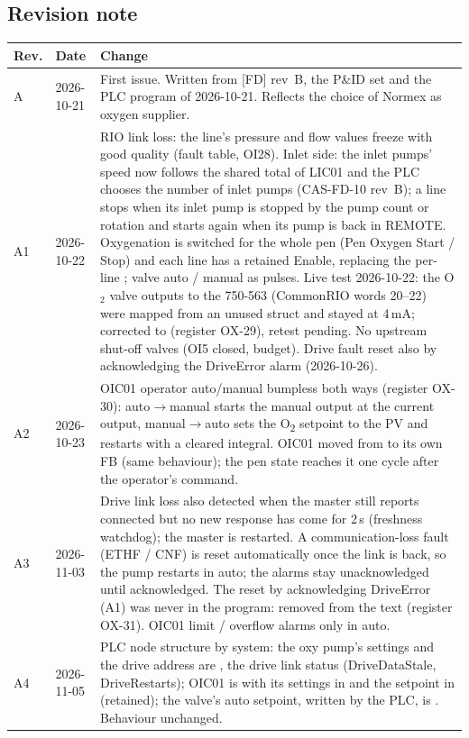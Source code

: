 \documentclass[11pt,a4paper]{article}
\newcommand{\Otwo}{O\textsubscript{2}}
\begin{document}
\subsection{Revision note}
\begin{small}
\begin{tabularx}{\textwidth}{@{}P{10mm}P{22mm}L@{}}
\toprule
Rev. & Date & Change \\
\midrule
A & 2026-10-21 & First issue. Written from [FD] rev~B, the P\&ID set and the PLC program of 2026-10-21. Reflects the choice of Normex as oxygen supplier. \\
A1 & 2026-10-22 & RIO link loss: the line's pressure and flow values freeze with good quality (fault table, OI28). Inlet side: the inlet pumps' speed now follows the shared total of LIC01 and the PLC chooses the number of inlet pumps (CAS-FD-10 rev~B); a line stops when its inlet pump is stopped by the pump count or rotation and starts again when its pump is back in REMOTE. Oxygenation is switched for the whole pen (Pen Oxygen Start / Stop) and each line has a retained Enable, replacing the per-line ; valve auto / manual as pulses. Live test
  2026-10-22: the O$_2$ valve outputs to the 750-563 (CommonRIO words 20--22) were mapped from an unused
  struct and stayed at 4\,mA; corrected to  (register OX-29), retest pending.
  No upstream shut-off valves (OI5 closed, budget). Drive fault reset also by acknowledging the
  DriveError alarm (2026-10-26). \\
A2 & 2026-10-23 & OIC01 operator auto/manual bumpless both ways (register OX-30): auto$\to$manual starts the
  manual output at the current output, manual$\to$auto sets the \Otwo{} setpoint to the PV and restarts
  with a cleared integral. OIC01 moved from  to its own FB 
  (same behaviour); the pen state reaches it one cycle after the operator's command. \\
A3 & 2026-11-03 & Drive link loss also detected when the master still reports connected but no new
  response has come for 2\,s (freshness watchdog); the master is restarted. A communication-loss fault
  (ETHF / CNF) is reset automatically once the link is back, so the pump restarts in auto; the alarms
  stay unacknowledged until acknowledged. The reset by acknowledging DriveError (A1) was never in the
  program: removed from the text (register OX-31). OIC01 limit / overflow alarms only in auto. \\
\bottomrule
A4 & 2026-11-05 & PLC node structure by system: the oxy pump's settings and the drive address are , the drive link status  (DriveDataStale, DriveRestarts); OIC01 is  with its settings in  and the setpoint in  (retained); the valve's auto setpoint, written by the PLC, is . Behaviour unchanged. \\

\end{tabularx}
\end{small}
\end{document}
